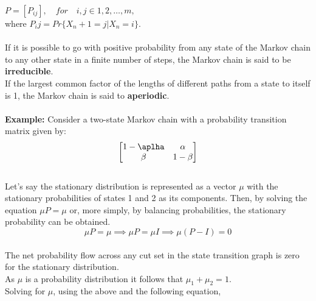 \documentclass[10pt,twocolumn,letterpaper]{article}
\begin{document}
\begin{math}
 P = [P_{ij} ], \quad for \quad i, j \in {1, 2, \dots , m}, 
\end{math}
\\ where \begin{math} P_ij = Pr\{X_n+1 = j |X_n = i\}. \end{math} \\
\\
If it is possible to go with positive probability from any state of the
Markov chain to any other state in a ﬁnite number of steps, the Markov
chain is said to be \textbf{irreducible}. \\If the largest common factor of the lengths
of different paths from a state to itself is 1, the Markov chain is said to
\textbf{aperiodic}.\\
\\ 
\textbf{Example: }Consider a two-state Markov chain with a probability transition matrix given by: 
 \begin{eqnarray*}
\begin{bmatrix}
1- \aplha & \alpha \\
\beta & 1 - \beta
\end{bmatrix}
\end{eqnarray*}
\\
Let's say the stationary distribution is represented as a vector \begin{math}
 \mu \end{math} with the stationary probabilities of states 1 and 2 as its components. Then, by solving the equation \begin{math}
  \mu P = \mu \end{math} or, more simply, by balancing probabilities, the stationary probability can be obtained. 
  \begin{equation*}
      \mu P = \mu \implies \mu P = \mu I \implies \mu(P - I) = 0 
  \end{equation*}
  \\The net probability flow across any cut set in the state transition graph is zero for the stationary distribution. \\ As \begin{math}
   \mu \end{math} is a probability distribution it follows that \begin{math} \mu_1 + \mu_2 = 1. \end{math} \\ Solving for \begin{math} \mu\end{math}, using the above and the following equation, \quad
\end{document}
